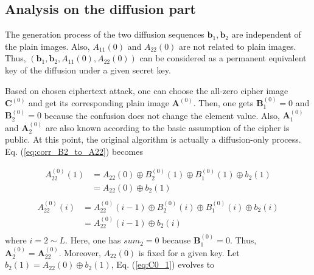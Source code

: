 \documentclass[final,3p,times,twocolumn]{elsarticle}
\begin{document}
\subsection{Analysis on the diffusion part}
\label{ssec:break_diffusion}
The generation process of the two diffusion sequences $\bm{b}_1,\bm{b}_2$ are independent of the plain images. Also, $A_{11}(0)$ and $A_{22}(0)$ are not related to plain images. Thus, $(\bm{b}_1,\bm{b}_2,A_{11}(0),A_{22}(0))$ can be considered as a permanent equivalent key of the diffusion under a given secret key. 


Based on chosen ciphertext attack, one can choose the all-zero cipher image $\bm{C}^{(0)}$ and get its corresponding plain image $\bm{A}^{(0)}$. Then, one gets $\bm{B}_1^{(0)}=0$ and $\bm{B}_2^{(0)}=0$ because the confusion does not change the element value. Also, $\bm{A}_1^{(0)}$ and $\bm{A}_2^{(0)}$ are also known according to the basic assumption of the cipher is public. At this point, the original algorithm is actually a diffusion-only process.
Eq. (\ref{eq:corr_B2_to_A22}) becomes

\begin{equation}
\begin{aligned}
A_{22}^{(0)}(1) & = A_{22}(0) \oplus B_2^{(0)}(1) \oplus B_{1}^{(0)}(1) \oplus b_{2}(1)\\
& = A_{22}(0) \oplus b_{2}(1)\\
\end{aligned}
\label{eq:C0_1}	
\end{equation}
\begin{equation}
\begin{aligned}
A_{22}^{(0)}(i) & = A_{22}^{(0)}(i-1) \oplus B_2^{(0)}(i) \oplus B_{1}^{(0)}(i) \oplus b_{2}(i)\\
& = A_{22}^{(0)}(i-1) \oplus b_{2}(i)\\
\end{aligned}
\label{eq:C0_i}	
\end{equation}
where $i=2 \sim L$. Here, one has $sum_2=0$ because $\bm{B}_1^{(0)}=0$. Thus, $\bm{A}_2^{(0)}=\bm{A}_{22}^{(0)}$. Moreover, $A_{22}(0)$ is fixed for a given key. Let $\hat{b}_{2}(1)=A_{22}(0) \oplus b_{2}(1)$, Eq. (\ref{eq:C0_1}) evolves to
\end{document}
